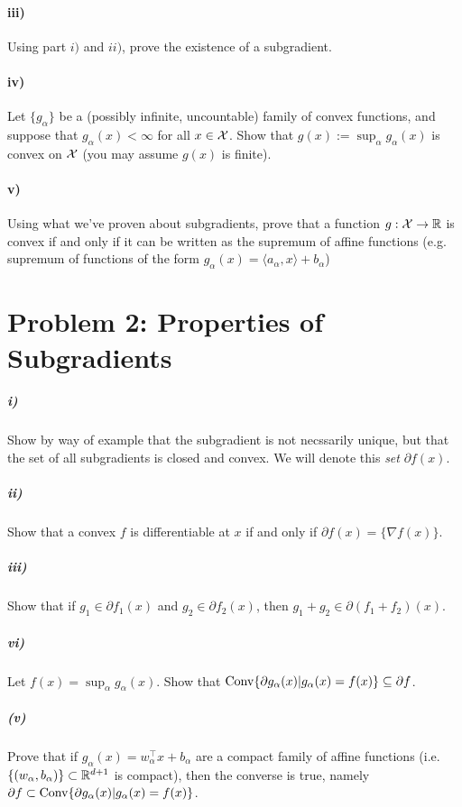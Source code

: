 \documentclass[12pt]{article}
\begin{document}
\paragraph{iii)} Using part $i)$ and $ii)$, prove the existence of a subgradient. 

\paragraph{iv)} Let $\{g_{\alpha}\}$ be a (possibly infinite, uncountable) family of convex functions, and suppose that $g_{\alpha}(x) < \infty$ for all $x \in {\cal X}$. Show that $g(x) := \sup_{\alpha} g_{\alpha}(x)$ is convex on ${\cal X}$ (you may assume $g(x)$ is finite).

\paragraph{v)} Using what we've proven about subgradients, prove that a function $g: {\cal X} \to \mathbb{R}$ is convex if and only if it can be written as the supremum of affine functions (e.g. supremum of functions of the form $g_{\alpha}(x) = \langle a_{\alpha}, x \rangle + b_{\alpha}$)

\section*{Problem 2: Properties of Subgradients}

\subparagraph{i)} Show by way of example that the subgradient is not necssarily unique, but that the set of all subgradients is closed and convex. We will denote this \emph{set} $\partial f(x)$.

\subparagraph{ii)} Show that a convex $f$ is differentiable at $x$ if and only if $\partial f(x) = \{\nabla f(x)\}$. 

\subparagraph{iii)} Show that if $g_1 \in \partial f_1(x)$ and $g_2 \in \partial f_2(x)$, then $g_1 + g_2 \in \partial(f_1 + f_2)(x)$. 



\subparagraph{vi)} Let $f(x) = \sup_{\alpha} g_{\alpha}(x)$. Show that $\mathrm{Conv} \{\partial g_{\alpha}(x) |  g_{\alpha}(x) =f(x) \} \subseteq \partial f$. 

\subparagraph{(v)} Prove that if $g_{\alpha}(x) = w_{\alpha}^\top x + b_{\alpha}$ are a compact family of affine functions (i.e. $\{(w_{\alpha},b_{\alpha})\} \subset \mathbb{R}^{d+1}$ is compact), then the converse is true, namely $\partial f \subset \mathrm{Conv} \{\partial g_{\alpha}(x) |  g_{\alpha}(x) =f(x) \} $. 
\end{document}
